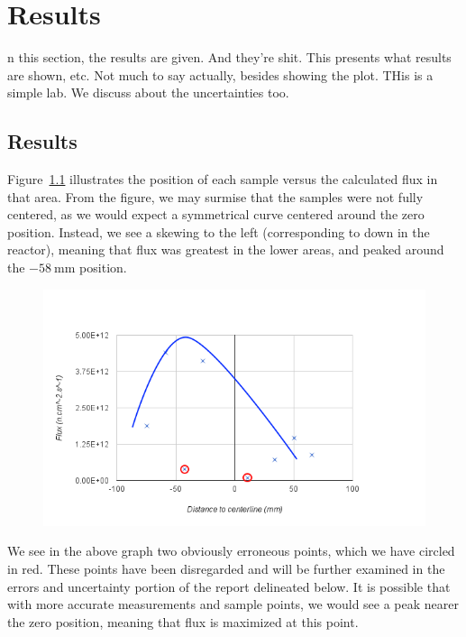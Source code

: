 %
%
\let\textcircled=\pgftextcircled
\chapter{Results}
\label{chap:result}

n this section, the results are given. And they're shit. This presents what results are shown, etc. Not much to say actually, besides showing the plot. THis is a simple lab. We discuss about the uncertainties too.

\section{Results}

Figure~\ref{fig:flux2} illustrates the position of each sample versus the calculated flux in that area. From the figure, we may surmise that the samples were not fully centered, as we would expect a symmetrical curve centered around the zero position. Instead, we see a skewing to the left (corresponding to down in the reactor), meaning that flux was greatest in the lower areas, and peaked around the $-58\ \text{mm}$ position.

\begin{figure}[t!]
	\centering
	\includegraphics[height=0.4\textheight]{fig02/flux2.png}
	\label{fig:flux2}
\end{figure}

We see in the above graph two obviously erroneous points, which we have circled in red. These points have been disregarded and will be further examined in the errors and uncertainty portion of the report delineated below. It is possible that with more accurate measurements and sample points, we would see a peak nearer the zero position, meaning that flux is maximized at this point. 

